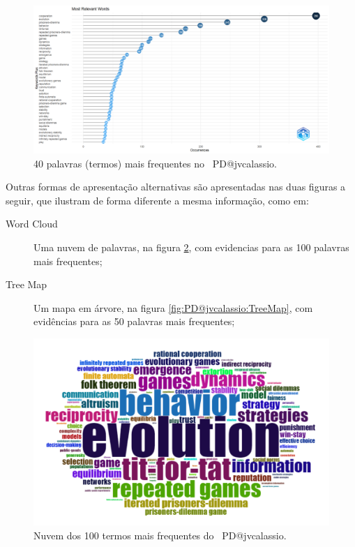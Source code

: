 \begin{figure}
    \centering
    \includegraphics[width=1\textwidth]{exploratory-data-analysis/jvcalassio/PesqBibliogr/PrisonersDilemma/WoS-20221201/Dataset/MostRelevantWords-2022-12-03.png}
    \caption{40 palavras (termos) mais frequentes no \dataset\ PD@jvcalassio.}
    \label{fig:PD@jvcalassio:Word:Occurrences}
\end{figure}

Outras formas de apresentação alternativas são apresentadas nas duas figuras a seguir, que ilustram de forma diferente a mesma informação, como em:
\begin{description}
    \item [Word Cloud] Uma nuvem de palavras, na figura \ref{fig:PD@jvcalassio:WordCloud-100words}, com evidencias para as 100 palavras mais frequentes;
    \item [Tree Map] Um mapa em árvore, na figura \ref{fig:PD@jvcalassio:TreeMap}, com evidências para as 50 palavras mais frequentes;
\end{description}

\begin{figure}
    \centering
    \includegraphics[width=1\textwidth]{exploratory-data-analysis/jvcalassio/PesqBibliogr/PrisonersDilemma/WoS-20221201/Dataset/WordCloud-100words.png}
    \caption{Nuvem dos 100 termos mais frequentes do \dataset\ PD@jvcalassio.}
    \label{fig:PD@jvcalassio:WordCloud-100words}
\end{figure}


